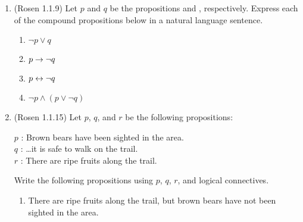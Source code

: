 \begin{enumerate}
\item \streasy (Rosen 1.1.9) Let $p$ and $q$ be the propositions  and , respectively.  
Express each of the compound propositions below in a natural language sentence.

\begin{multicols}{2}
\begin{enumerate}
\item $\neg{p} \vee q$
\item $p \rightarrow \neg{q}$
\item $p \leftrightarrow \neg{q}$
\item $\neg{p} \wedge (p \vee \neg{q})$
\end{enumerate}
\end{multicols}


\item \strmedium (Rosen 1.1.15) Let $p$, $q$, and $r$ be the following propositions:

$p$ : Brown bears have been sighted in the area.\\
$q$ : \ldots it is safe to walk on the trail.\\
$r$ : There are ripe fruits along the trail.

Write the following propositions using $p$, $q$, $r$, and logical connectives.

\begin{enumerate}
\item There are ripe fruits along the trail, but brown bears have not been sighted in the area.


\end{enumerate}
\end{enumerate}
